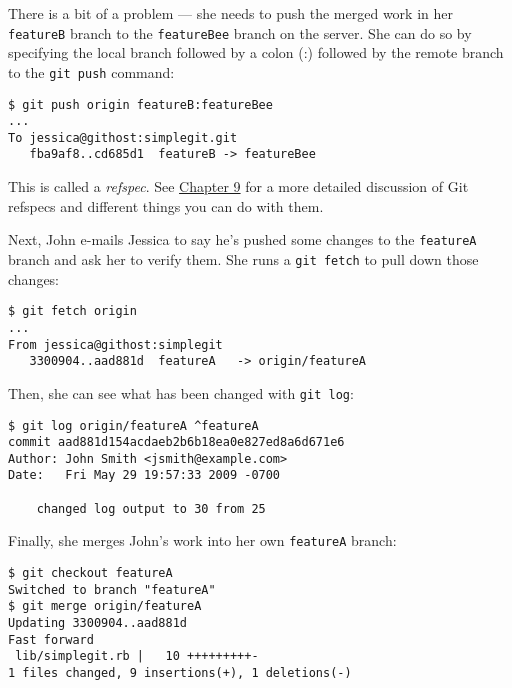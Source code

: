 \documentclass[a4paper]{book}
\newcommand{\prechap}{Chapter }
\newcommand{\postchap}{}
\newcommand{\chapref}[1]{\hyperref[chap:#1]{\prechap #1\postchap}}
\begin{document}
There is a bit of a problem --- she needs to push the merged work in her \texttt{featureB} branch to the \texttt{featureBee} branch on the server. She can do so by specifying the local branch followed by a colon (:) followed by the remote branch to the \texttt{git push} command:

\begin{shaded}\begin{verbatim}
$ git push origin featureB:featureBee
...
To jessica@githost:simplegit.git
   fba9af8..cd685d1  featureB -> featureBee
\end{verbatim}\end{shaded}

This is called a \emph{refspec}. See \chapref{9} for a more detailed discussion of Git refspecs and different things you can do with them.

Next, John e-mails Jessica to say he's pushed some changes to the \texttt{featureA} branch and ask her to verify them. She runs a \texttt{git fetch} to pull down those changes:

\begin{shaded}\begin{verbatim}
$ git fetch origin
...
From jessica@githost:simplegit
   3300904..aad881d  featureA   -> origin/featureA
\end{verbatim}\end{shaded}

Then, she can see what has been changed with \texttt{git log}:

\begin{shaded}\begin{verbatim}
$ git log origin/featureA ^featureA
commit aad881d154acdaeb2b6b18ea0e827ed8a6d671e6
Author: John Smith <jsmith@example.com>
Date:   Fri May 29 19:57:33 2009 -0700

    changed log output to 30 from 25
\end{verbatim}\end{shaded}

Finally, she merges John's work into her own \texttt{featureA} branch:

\begin{shaded}\begin{verbatim}
$ git checkout featureA
Switched to branch "featureA"
$ git merge origin/featureA
Updating 3300904..aad881d
Fast forward
 lib/simplegit.rb |   10 +++++++++-
1 files changed, 9 insertions(+), 1 deletions(-)
\end{verbatim}\end{shaded}
\end{document}
